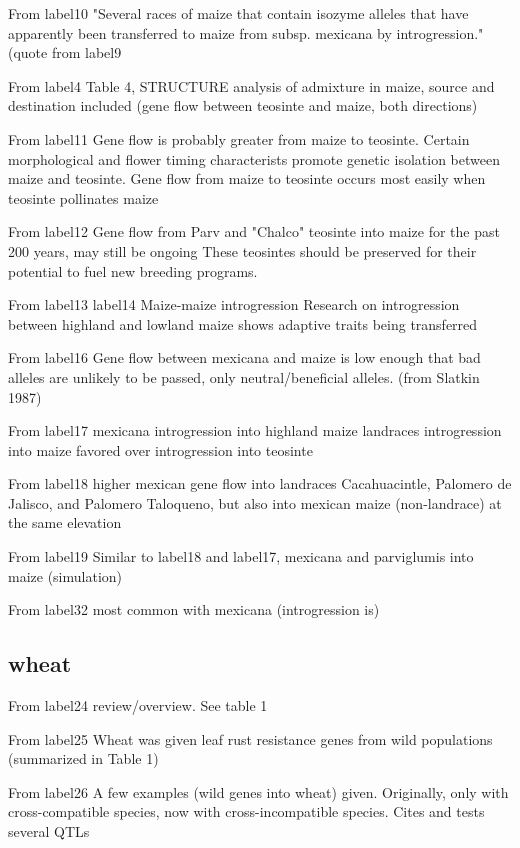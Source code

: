 \documentclass[11pt]{article}
\begin{document}
From {label10}
"Several races of maize that contain isozyme alleles that have apparently been transferred to maize from subsp. mexicana by introgression." (quote from {label9}

From {label4}
Table 4, STRUCTURE analysis of admixture in maize, source and destination included (gene flow between teosinte and maize, both directions)

From {label11}
Gene flow is probably greater from maize to teosinte.
Certain morphological and flower timing characterists promote genetic isolation between maize and teosinte.
Gene flow from maize to teosinte occurs most easily when teosinte pollinates maize

From {label12}
Gene flow from Parv and "Chalco" teosinte into maize for the past 200 years, may still be ongoing
These teosintes should be preserved for their potential to fuel new breeding programs.

From {label13} {label14}
Maize-maize introgression
Research on introgression between highland and lowland maize shows adaptive traits being transferred

From {label16}
Gene flow between mexicana and maize is low enough that bad alleles are unlikely to be passed, only neutral/beneficial alleles. (from Slatkin 1987)

From {label17}
mexicana introgression into highland maize landraces
introgression into maize favored over introgression into teosinte

From {label18}
higher mexican gene flow into landraces Cacahuacintle, Palomero de Jalisco, and Palomero Taloqueno, but also into mexican maize (non-landrace) at the same elevation

From {label19}
Similar to label18 and label17, mexicana and parviglumis into maize (simulation)

From {label32}
most common with mexicana (introgression is)

\subsection*{wheat}

From {label24}
review/overview.  See table 1

From {label25}
Wheat was given leaf rust resistance genes from wild populations (summarized in Table 1)

From {label26}
A few examples (wild genes into wheat) given.  Originally, only with cross-compatible species, now with cross-incompatible species.
Cites and tests several QTLs
\end{document}
